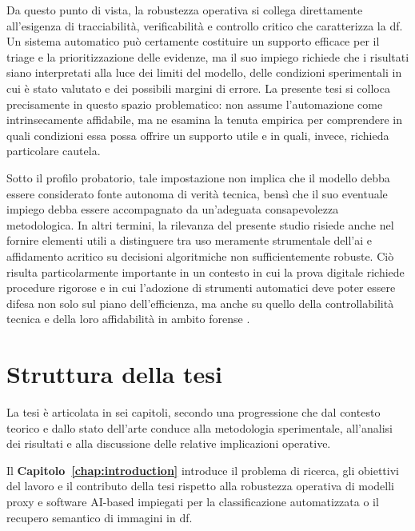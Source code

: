 Da questo punto di vista, la robustezza operativa si collega direttamente all'esigenza di tracciabilità, verificabilità e controllo critico che caratterizza la \gls{df}. Un sistema automatico può certamente costituire un supporto efficace per il triage e la prioritizzazione delle evidenze, ma il suo impiego richiede che i risultati siano interpretati alla luce dei limiti del modello, delle condizioni sperimentali in cui è stato valutato e dei possibili margini di errore. La presente tesi si colloca precisamente in questo spazio problematico: non assume l'automazione come intrinsecamente affidabile, ma ne esamina la tenuta empirica per comprendere in quali condizioni essa possa offrire un supporto utile e in quali, invece, richieda particolare cautela.

Sotto il profilo probatorio, tale impostazione non implica che il modello debba essere considerato fonte autonoma di verità tecnica, bensì che il suo eventuale impiego debba essere accompagnato da un'adeguata consapevolezza metodologica. In altri termini, la rilevanza del presente studio risiede anche nel fornire elementi utili a distinguere tra uso meramente strumentale dell'\gls{ai} e affidamento acritico su decisioni algoritmiche non sufficientemente robuste. Ciò risulta particolarmente importante in un contesto in cui la prova digitale richiede procedure rigorose e in cui l'adozione di strumenti automatici deve poter essere difesa non solo sul piano dell'efficienza, ma anche su quello della controllabilità tecnica e della loro affidabilità in ambito forense \cite{cpp1988,aiact2024,swgde_guidelines}.


\section{Struttura della tesi}
La tesi è articolata in sei capitoli, secondo una progressione che dal contesto teorico e dallo stato dell'arte conduce alla metodologia sperimentale, all'analisi dei risultati e alla discussione delle relative implicazioni operative.

Il \textbf{Capitolo~\ref{chap:introduction}} introduce il problema di ricerca, gli obiettivi del lavoro e il contributo della tesi rispetto alla robustezza operativa di modelli proxy e software AI-based impiegati per la classificazione automatizzata o il recupero semantico di immagini in \gls{df}.

